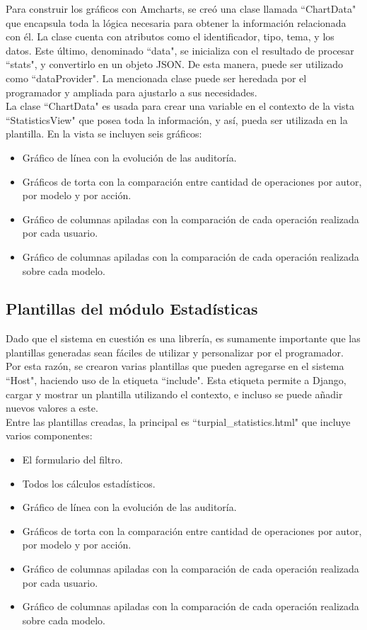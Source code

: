 Para construir los gráficos con Amcharts, se creó una clase llamada “ChartData" que encapsula toda la lógica necesaria para obtener la información relacionada con él. La clase cuenta con atributos como el identificador, tipo, tema, y los datos. Este último, denominado “data", se inicializa con el resultado de procesar “stats", y convertirlo en un objeto JSON. De esta manera, puede ser utilizado como “dataProvider". La mencionada clase puede ser heredada por el programador y ampliada para ajustarlo a sus necesidades.\\

La clase “ChartData" es usada para crear una variable en el contexto de la vista “StatisticsView" que posea toda la información, y así, pueda ser utilizada en la plantilla. En la vista se incluyen seis gráficos:

\begin{itemize}
    \item Gráfico de línea con la evolución de las auditoría.
    \item Gráficos de torta con la comparación entre cantidad de operaciones por autor, por modelo y por acción.
    \item Gráfico de columnas apiladas con la comparación de cada operación realizada por cada usuario.
    \item Gráfico de columnas apiladas con la comparación de cada operación realizada sobre cada modelo.
\end{itemize}


\subsection{Plantillas del módulo Estadísticas}

Dado que el sistema en cuestión es una librería, es sumamente importante que las plantillas generadas sean fáciles de utilizar y personalizar por el programador. Por esta razón, se crearon varias plantillas que pueden agregarse en el sistema “Host", haciendo uso de la etiqueta  “include". Esta etiqueta permite a Django, cargar y mostrar un plantilla utilizando el contexto, e incluso se puede añadir nuevos valores a este.\\

Entre las plantillas creadas, la principal es “turpial\_statistics.html" que incluye varios componentes:

\begin{itemize}
    \item El formulario del filtro.
    \item Todos los cálculos estadísticos.
    \item Gráfico de línea con la evolución de las auditoría.
    \item Gráficos de torta con la comparación entre cantidad de operaciones por autor, por modelo y por acción.
    \item Gráfico de columnas apiladas con la comparación de cada operación realizada por cada usuario.
    \item Gráfico de columnas apiladas con la comparación de cada operación realizada sobre cada modelo.
\end{itemize}

